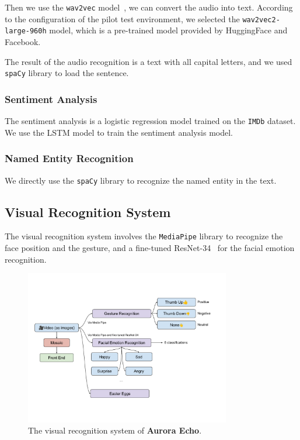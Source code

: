 \documentclass{article}
\begin{document}
    Then we use the \texttt{wav2vec} model~\cite{DBLP:journals/corr/abs-2006-11477}, we can convert the audio into text.
    According to the configuration of the pilot test environment, we selected the \texttt{wav2vec2-large-960h} model, which is a pre-trained model provided by HuggingFace and Facebook.

    The result of the audio recognition is a text with all capital letters, and we used \texttt{spaCy}\cite{spacy2,Honnibal_spaCy_Industrial-strength_Natural_2020} library to load the sentence.

    \subsubsection{Sentiment Analysis}\label{subsubsec:sentiment}

    The sentiment analysis is a logistic regression model trained on the \texttt{IMDb}\cite{zm1y-b270-20, maas-EtAl:2011:ACL-HLT2011} dataset.
    We use the LSTM\cite{43905} model to train the sentiment analysis model.

    \subsubsection{Named Entity Recognition}\label{subsubsec:ner}

    We directly use the \texttt{spaCy} library to recognize the named entity in the text.

    \subsection{Visual Recognition System}\label{subsec:visual}

    The visual recognition system involves the \texttt{MediaPipe} library to recognize the face position and the gesture, and a fine-tuned ResNet-34~\cite{DBLP:journals/corr/HeZRS15} for the facial emotion recognition.

    \begin{figure}[hhhh]
        \centering
        \includegraphics[width=0.8\textwidth]{./figures/vision-arch}
        \caption{The visual recognition system of \textbf{Aurora Echo}.}
        \label{fig:visual-process}
    \end{figure}
\end{document}
